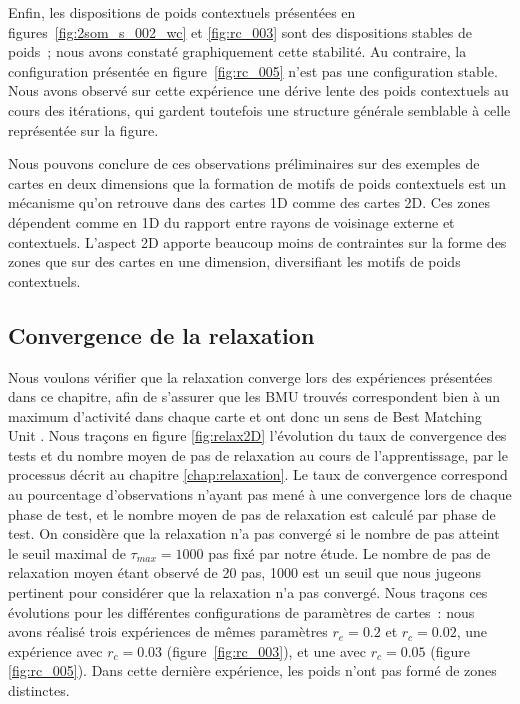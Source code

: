 \documentclass[../main]{subfiles}
\begin{document}
Enfin, les dispositions de poids contextuels présentées en figures~\ref{fig:2som_s_002_wc} et \ref{fig:rc_003} sont des dispositions stables de poids~; nous avons constaté graphiquement cette stabilité. Au contraire, la configuration présentée en figure~\ref{fig:rc_005} n'est pas une configuration stable. Nous avons observé sur cette expérience une dérive lente des poids contextuels au cours des itérations, qui gardent toutefois une structure générale semblable à celle représentée sur la figure.

Nous pouvons conclure de ces observations préliminaires sur des exemples de cartes en deux dimensions que la formation de motifs de poids contextuels est un mécanisme qu'on retrouve dans des cartes 1D comme des cartes 2D. 
Ces zones dépendent comme en 1D du rapport entre rayons de voisinage externe et contextuels.
L'aspect 2D apporte beaucoup moins de contraintes sur la forme des zones que sur des cartes en une dimension, diversifiant les motifs de poids contextuels.


\subsection{Convergence de la relaxation \label{par:conv2D}}

Nous voulons vérifier que la relaxation converge lors des expériences présentées dans ce chapitre, afin de s'assurer que les BMU trouvés correspondent bien à un maximum d'activité dans chaque carte et ont donc un sens de \og Best Matching Unit \fg{}.
Nous traçons en figure \ref{fig:relax2D} l'évolution du taux de convergence des tests et du nombre moyen de pas de relaxation au cours de l'apprentissage, par le processus décrit au chapitre \ref{chap:relaxation}. Le taux de convergence correspond au pourcentage d'observations n'ayant pas mené à une convergence lors de chaque phase de test, et le nombre moyen de pas de relaxation est calculé par phase de test.
On considère que la relaxation n'a pas convergé si le nombre de pas atteint le seuil maximal de $\tau_{max} = 1000$ pas fixé par notre étude. Le nombre de pas de relaxation moyen étant observé de 20 pas, 1000 est un seuil que nous jugeons pertinent pour considérer que la relaxation n'a pas convergé.
Nous traçons ces évolutions pour les différentes configurations de paramètres de cartes~: nous avons réalisé trois expériences de mêmes paramètres $r_e=0.2$ et $r_c = 0.02$, une expérience avec $r_c = 0.03$ (figure~\ref{fig:rc_003}), et une avec $r_c = 0.05$ (figure \ref{fig:rc_005}).
Dans cette dernière expérience, les poids n'ont pas formé de zones distinctes.
\end{document}
